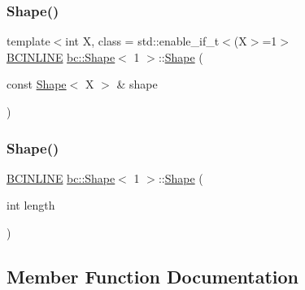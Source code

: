 \subsubsection{\texorpdfstring{Shape()}{Shape()}\hspace{0.1cm}{\footnotesize\ttfamily [3/4]}}
{\footnotesize\ttfamily template$<$int X, class  = std\+::enable\+\_\+if\+\_\+t$<$(\+X$>$=1$>$ \\
\hyperlink{common_8h_a6699e8b0449da5c0fafb878e59c1d4b1}{B\+C\+I\+N\+L\+I\+NE} \hyperlink{structbc_1_1Shape}{bc\+::\+Shape}$<$ 1 $>$\+::\hyperlink{structbc_1_1Shape}{Shape} (\begin{DoxyParamCaption}\item[{const \hyperlink{structbc_1_1Shape}{Shape}$<$ X $>$ \&}]{shape }\end{DoxyParamCaption})\hspace{0.3cm}{\ttfamily [inline]}}

\mbox{\label{structbc_1_1Shape_3_011_01_4_adedf3ad67f41a40762c97de4072a2eb7}} 
\subsubsection{\texorpdfstring{Shape()}{Shape()}\hspace{0.1cm}{\footnotesize\ttfamily [4/4]}}
{\footnotesize\ttfamily \hyperlink{common_8h_a6699e8b0449da5c0fafb878e59c1d4b1}{B\+C\+I\+N\+L\+I\+NE} \hyperlink{structbc_1_1Shape}{bc\+::\+Shape}$<$ 1 $>$\+::\hyperlink{structbc_1_1Shape}{Shape} (\begin{DoxyParamCaption}\item[{int}]{length }\end{DoxyParamCaption})\hspace{0.3cm}{\ttfamily [inline]}}



\subsection{Member Function Documentation}
\mbox{\label{structbc_1_1Shape_3_011_01_4_a8afd8dd92e287fcd0b9f4518f320e945}} 
